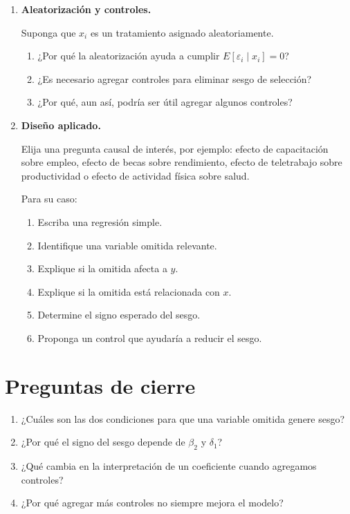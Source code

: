 \documentclass[11pt]{article}
\begin{document}
\begin{enumerate}[label=\textbf{Ejercicio \arabic*.}, leftmargin=*]
\begin{enumerate}[label=\alph*)]
    \item ¿Incluir $z$ genera sesgo?
    \item ¿Qué efecto puede tener sobre la varianza de los estimadores?
    \item ¿Por qué no siempre conviene agregar todas las variables disponibles?
\end{enumerate}

\item \textbf{Aleatorización y controles.}

Suponga que $x_i$ es un tratamiento asignado aleatoriamente.

\begin{enumerate}[label=\alph*)]
    \item ¿Por qué la aleatorización ayuda a cumplir $E[\varepsilon_i\mid x_i]=0$?
    \item ¿Es necesario agregar controles para eliminar sesgo de selección?
    \item ¿Por qué, aun así, podría ser útil agregar algunos controles?
\end{enumerate}

\item \textbf{Diseño aplicado.}

Elija una pregunta causal de interés, por ejemplo: efecto de capacitación sobre empleo, efecto de becas sobre rendimiento, efecto de teletrabajo sobre productividad o efecto de actividad física sobre salud.

Para su caso:
\begin{enumerate}[label=\alph*)]
    \item Escriba una regresión simple.
    \item Identifique una variable omitida relevante.
    \item Explique si la omitida afecta a $y$.
    \item Explique si la omitida está relacionada con $x$.
    \item Determine el signo esperado del sesgo.
    \item Proponga un control que ayudaría a reducir el sesgo.
\end{enumerate}

\end{enumerate}

\section*{Preguntas de cierre}

\begin{enumerate}[label=\arabic*.]
    \item ¿Cuáles son las dos condiciones para que una variable omitida genere sesgo?
    \item ¿Por qué el signo del sesgo depende de $\beta_2$ y $\delta_1$?
    \item ¿Qué cambia en la interpretación de un coeficiente cuando agregamos controles?
    \item ¿Por qué agregar más controles no siempre mejora el modelo?
\end{enumerate}
\end{document}
